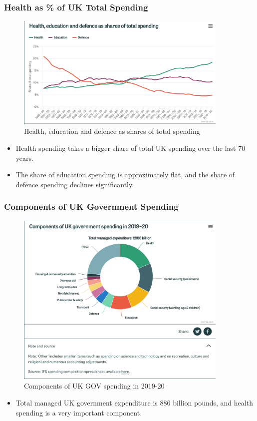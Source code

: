         \subsubsection{Health as \% of UK Total Spending}  
            \begin{figure}[H]
                \centering
                \includegraphics[width=4in]{images/ch3/4.png}
                \caption{Health, education and defence as shares of total spending}
            \end{figure} 
        \begin{itemize}           
            \item Health spending takes a bigger share of total UK spending over the last 70 years.
            \item The share of education spending is approximately flat, and the share of defence spending declines significantly.
        \end{itemize}
        
        \subsubsection{Components of UK Government Spending}  
            \begin{figure}[H]
                \centering
                \includegraphics[width=4in]{images/ch3/5.png}
                \caption{Components of UK GOV spending in 2019-20}
            \end{figure} 
            \begin{itemize}           
                \item Total managed UK government expenditure is 886 billion pounds, and health spending is a very important component.
            \end{itemize}
